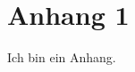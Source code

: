 
\setpagestylefoot
\renewcommand{\thefigure}{A\arabic{figure}}
\renewcommand\thelstlisting{A\arabic{lstlisting}}
\renewcommand\thetable{A\arabic{table}}





\ifliteratur
    \printbibliography
\fi


\ifanhang
    \addchap{\langanhang}

    \section*{Anhang 1}
        Ich bin ein Anhang.
\fi


\ifglossar
    \printglossary[style=altlist,title=\langglossar]
\fi
